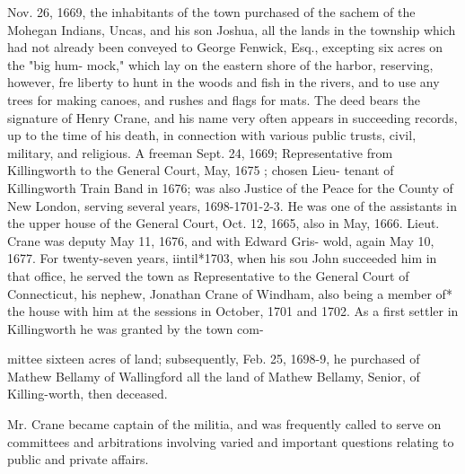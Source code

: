 Nov. 26, 1669, the inhabitants of the town purchased of the 
sachem of the Mohegan Indians, Uncas, and his son Joshua, all 
the lands in the township which had not already been conveyed to 
George Fenwick, Esq., excepting six acres on the "big hum- 
mock," which lay on the eastern shore of the harbor, reserving, 
however, fre liberty to hunt in the woods and fish in the rivers, 
and to use any trees for making canoes, and rushes and flags for 
mats. The deed bears the signature of Henry Crane, and his 
name very often appears in succeeding records, up to the time of 
his death, in connection with various public trusts, civil, military, 
and religious. A freeman Sept. 24, 1669; Representative from 
Killingworth to the General Court, May, 1675 ; chosen Lieu- 
tenant of Killingworth Train Band in 1676; was also Justice of 
the Peace for the County of New London, serving several years, 
1698-1701-2-3. He was one of the assistants in the upper 
house of the General Court, Oct. 12, 1665, also in May, 1666. 
Lieut. Crane was deputy May 11, 1676, and with Edward Gris- 
wold, again May 10, 1677. For twenty-seven years, iintil*1703, 
when his sou John succeeded him in that office, he served the 
town as Representative to the General Court of Connecticut, his 
nephew, Jonathan Crane of Windham, also being a member of* 
the house with him at the sessions in October, 1701 and 1702. 
As a first settler in Killingworth he was granted by the town com- 




mittee sixteen acres of land; subsequently, Feb. 25, 1698-9, he 
purchased of Mathew Bellamy of Wallingford all the land of 
Mathew Bellamy, Senior, of Killing-worth, then deceased. 

Mr. Crane became captain of the militia, and was frequently 
called to serve on committees and arbitrations involving varied 
and important questions relating to public and private affairs. 

